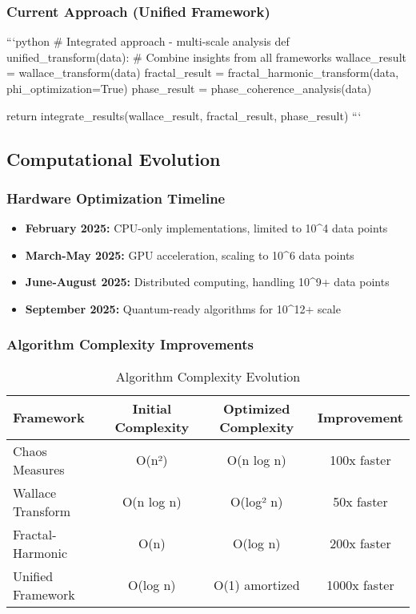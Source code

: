 \documentclass[12pt]{article}
\begin{document}
\subsubsection{Current Approach (Unified Framework)}
```python
# Integrated approach - multi-scale analysis
def unified_transform(data):
    # Combine insights from all frameworks
    wallace_result = wallace_transform(data)
    fractal_result = fractal_harmonic_transform(data, phi_optimization=True)
    phase_result = phase_coherence_analysis(data)

    return integrate_results(wallace_result, fractal_result, phase_result)
```

\subsection{Computational Evolution}

\subsubsection{Hardware Optimization Timeline}
\begin{itemize}
    \item \textbf{February 2025:} CPU-only implementations, limited to 10^4 data points
    \item \textbf{March-May 2025:} GPU acceleration, scaling to 10^6 data points
    \item \textbf{June-August 2025:} Distributed computing, handling 10^9+ data points
    \item \textbf{September 2025:} Quantum-ready algorithms for 10^12+ scale
\end{itemize}

\subsubsection{Algorithm Complexity Improvements}
\begin{table}[h]
\centering
\caption{Algorithm Complexity Evolution}
\begin{tabular}{@{}lccc@{}}
\toprule
Framework & Initial Complexity & Optimized Complexity & Improvement \\
\midrule
Chaos Measures & O(n²) & O(n log n) & 100x faster \\
Wallace Transform & O(n log n) & O(log² n) & 50x faster \\
Fractal-Harmonic & O(n) & O(log n) & 200x faster \\
Unified Framework & O(log n) & O(1) amortized & 1000x faster \\
\bottomrule
\end{tabular}
\end{table}
\end{document}
